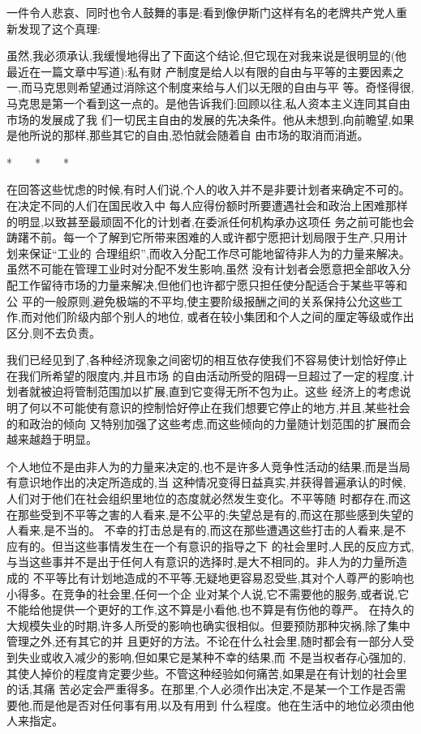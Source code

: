 ﻿\documentclass[12pt]{article}
\begin{document}
一件令人悲哀、同时也令人鼓舞的事是:看到像伊斯门这样有名的老牌共产党人重新发现了这个真理:

虽然,我必须承认,我缓慢地得出了下面这个结论,但它现在对我来说是很明显的(他最近在一篇文章中写道):私有财
产制度是给人以有限的自由与平等的主要因素之一,而马克思则希望通过消除这个制度来给与人们以无限的自由与平
等。奇怪得很,马克思是第一个看到这一点的。是他告诉我们:回顾以往,私人资本主义连同其自由市场的发展成了我
们一切民主自由的发展的先决条件。他从未想到,向前瞻望,如果是他所说的那样,那些其它的自由,恐怕就会随着自
由市场的取消而消逝。

*　　*　　*

在回答这些忧虑的时候,有时人们说,个人的收入并不是非要计划者来确定不可的。在决定不同的人们在国民收入中
每人应得份额时所要遭遇社会和政治上困难那样的明显,以致甚至最顽固不化的计划者,在委派任何机构承办这项任
务之前可能也会踌躇不前。每一个了解到它所带来困难的人或许都宁愿把计划局限于生产,只用计划来保证``工业的
合理组织'',而收入分配工作尽可能地留待非人为的力量来解决。虽然不可能在管理工业时对分配不发生影响,虽然
没有计划者会愿意把全部收入分配工作留待市场的力量来解决,但他们也许都宁愿只担任使分配适合于某些平等和公
平的一般原则,避免极端的不平均,使主要阶级报酬之间的关系保持公允这些工作,而对他们阶级内部个别人的地位,
或者在较小集团和个人之间的厘定等级或作出区分,则不去负责。

我们已经见到了,各种经济现象之间密切的相互依存使我们不容易使计划恰好停止在我们所希望的限度内,并且市场
的自由活动所受的阻碍一旦超过了一定的程度,计划者就被迫将管制范围加以扩展,直到它变得无所不包为止。这些
经济上的考虑说明了何以不可能使有意识的控制恰好停止在我们想要它停止的地方,并且,某些社会的和政治的倾向
又特别加强了这些考虑,而这些倾向的力量随计划范围的扩展而会越来越趋于明显。

个人地位不是由非人为的力量来决定的,也不是许多人竞争性活动的结果,而是当局有意识地作出的决定所造成的,当
这种情况变得日益真实,并获得普遍承认的时候,人们对于他们在社会组织里地位的态度就必然发生变化。不平等随
时都存在,而这在那些受到不平等之害的人看来,是不公平的;失望总是有的,而这在那些感到失望的人看来,是不当的。
不幸的打击总是有的,而这在那些遭遇这些打击的人看来,是不应有的。但当这些事情发生在一个有意识的指导之下
的社会里时,人民的反应方式,与当这些事并不是出于任何人有意识的选择时,是大不相同的。非人为的力量所造成的
不平等比有计划地造成的不平等,无疑地更容易忍受些,其对个人尊严的影响也小得多。在竞争的社会里,任何一个企
业对某个人说,它不需要他的服务,或者说,它不能给他提供一个更好的工作,这不算是小看他,也不算是有伤他的尊严。
在持久的大规模失业的时期,许多人所受的影响也确实很相似。但要预防那种灾祸,除了集中管理之外,还有其它的并
且更好的方法。不论在什么社会里,随时都会有一部分人受到失业或收入减少的影响,但如果它是某种不幸的结果,而
不是当权者存心强加的,其使人掉价的程度肯定要少些。不管这种经验如何痛苦,如果是在有计划的社会里的话,其痛
苦必定会严重得多。在那里,个人必须作出决定,不是某一个工作是否需要他,而是他是否对任何事有用,以及有用到
什么程度。他在生活中的地位必须由他人来指定。
\end{document}
